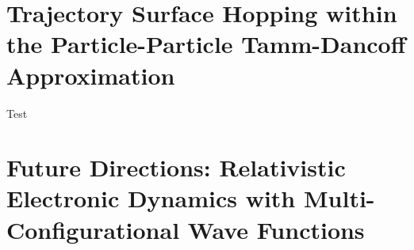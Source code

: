 \documentclass[12pt]{article}
\begin{document}
\section{Trajectory Surface Hopping within the Particle-Particle Tamm-Dancoff Approximation}
\label{sec:pp-TSH}
Test\cite{DBWY16_JCTC935,DBWY16_Accepted1,DBWY16_Submitted1,DBWY16_Submitted2}

\section{Future Directions: Relativistic Electronic Dynamics with Multi-Configurational Wave Functions}
\label{sec:Future}


\end{document}

